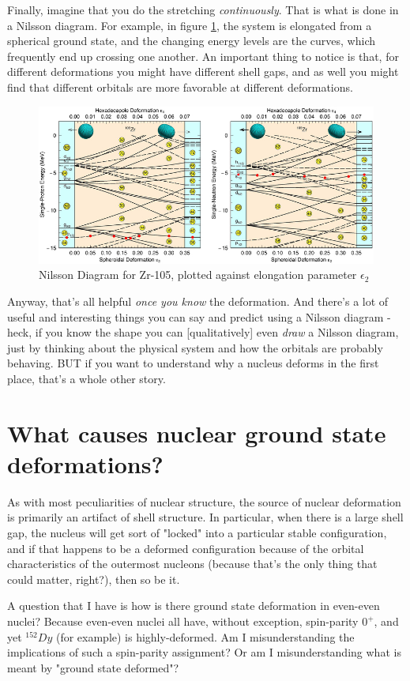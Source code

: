 Finally, imagine that you do the stretching \textit{continuously}. That is what is done in a Nilsson diagram. For example, in figure \ref{fig:NilssonDiagram}, the system is elongated from a spherical ground state, and the changing energy levels are the curves, which frequently end up crossing one another. An important thing to notice is that, for different deformations you might have different shell gaps, and as well you might find that different orbitals are more favorable at different deformations.

\begin{figure}
\centering
\includegraphics[width=0.7\linewidth]{TeX_files/NilssonDiagram}
\caption[Nilsson Diagram for Zr-105]{Nilsson Diagram for Zr-105, plotted against elongation parameter $\epsilon_2$}
\label{fig:NilssonDiagram}
\end{figure}

Anyway, that's all helpful \textit{once you know} the deformation. And there's a lot of useful and interesting things you can say and predict using a Nilsson diagram - heck, if you know the shape you can [qualitatively] even \textit{draw} a Nilsson diagram, just by thinking about the physical system and how the orbitals are probably behaving.  BUT if you want to understand why a nucleus deforms in the first place, that's a whole other story.

\section{What causes nuclear ground state deformations?}

As with most peculiarities of nuclear structure, the source of nuclear deformation is primarily an artifact of shell structure. In particular, when there is a large shell gap, the nucleus will get sort of "locked" into a particular stable configuration, and if that happens to be a deformed configuration because of the orbital characteristics of the outermost nucleons (because that's the only thing that could matter, right?), then so be it.

A question that I have is how is there ground state deformation in even-even nuclei? Because even-even nuclei all have, without exception, spin-parity $0^+$, and yet $^{152}Dy$ (for example) is highly-deformed. Am I misunderstanding the implications of such a spin-parity assignment? Or am I misunderstanding what is meant by "ground state deformed"?

